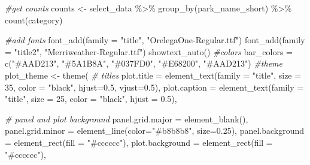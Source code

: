 \documentclass[
]{article}
\newenvironment{Shaded}{\begin{snugshade}}{\end{snugshade}}
\newcommand{\AttributeTok}[1]{\textcolor[rgb]{0.77,0.63,0.00}{#1}}
\newcommand{\CommentTok}[1]{\textcolor[rgb]{0.56,0.35,0.01}{\textit{#1}}}
\newcommand{\DecValTok}[1]{\textcolor[rgb]{0.00,0.00,0.81}{#1}}
\newcommand{\FloatTok}[1]{\textcolor[rgb]{0.00,0.00,0.81}{#1}}
\newcommand{\FunctionTok}[1]{\textcolor[rgb]{0.00,0.00,0.00}{#1}}
\newcommand{\NormalTok}[1]{#1}
\newcommand{\OtherTok}[1]{\textcolor[rgb]{0.56,0.35,0.01}{#1}}
\newcommand{\SpecialCharTok}[1]{\textcolor[rgb]{0.00,0.00,0.00}{#1}}
\newcommand{\StringTok}[1]{\textcolor[rgb]{0.31,0.60,0.02}{#1}}
\begin{document}
\begin{Shaded}
\begin{Highlighting}[]
\CommentTok{\#get counts}
\NormalTok{counts }\OtherTok{\textless{}{-}}\NormalTok{ select\_data }\SpecialCharTok{\%\textgreater{}\%} \FunctionTok{group\_by}\NormalTok{(park\_name\_short) }\SpecialCharTok{\%\textgreater{}\%} \FunctionTok{count}\NormalTok{(category)}
\end{Highlighting}
\end{Shaded}

\begin{Shaded}
\begin{Highlighting}[]
\CommentTok{\#add fonts}
\FunctionTok{font\_add}\NormalTok{(}\AttributeTok{family =} \StringTok{"title"}\NormalTok{, }\StringTok{"OrelegaOne{-}Regular.ttf"}\NormalTok{)}
\FunctionTok{font\_add}\NormalTok{(}\AttributeTok{family =} \StringTok{"title2"}\NormalTok{, }\StringTok{"Merriweather{-}Regular.ttf"}\NormalTok{)}
\FunctionTok{showtext\_auto}\NormalTok{()}
\CommentTok{\#colors}
\NormalTok{bar\_colors }\OtherTok{=} \FunctionTok{c}\NormalTok{(}\StringTok{"\#AAD213"}\NormalTok{, }\StringTok{"\#5A1B8A"}\NormalTok{, }\StringTok{"\#037FD0"}\NormalTok{, }\StringTok{"\#E68200"}\NormalTok{, }\StringTok{"\#AAD213"}\NormalTok{)}
\CommentTok{\#theme}
\NormalTok{plot\_theme }\OtherTok{\textless{}{-}} \FunctionTok{theme}\NormalTok{(}
 \CommentTok{\# titles}
  \AttributeTok{plot.title =} \FunctionTok{element\_text}\NormalTok{(}\AttributeTok{family =} \StringTok{"title"}\NormalTok{, }\AttributeTok{size =} \DecValTok{35}\NormalTok{, }\AttributeTok{color =} \StringTok{"black"}\NormalTok{, }\AttributeTok{hjust=}\FloatTok{0.5}\NormalTok{, }\AttributeTok{vjust=}\FloatTok{0.5}\NormalTok{),}
  \AttributeTok{plot.caption =} \FunctionTok{element\_text}\NormalTok{(}\AttributeTok{family =} \StringTok{"title"}\NormalTok{, }\AttributeTok{size =} \DecValTok{25}\NormalTok{, }\AttributeTok{color =} \StringTok{"black"}\NormalTok{, }\AttributeTok{hjust =} \FloatTok{0.5}\NormalTok{),}
  
  \CommentTok{\# panel and plot background}
  \AttributeTok{panel.grid.major =} \FunctionTok{element\_blank}\NormalTok{(),}
  \AttributeTok{panel.grid.minor =} \FunctionTok{element\_line}\NormalTok{(}\AttributeTok{color=}\StringTok{"\#b8b8b8"}\NormalTok{, }\AttributeTok{size=}\FloatTok{0.25}\NormalTok{),}
  \AttributeTok{panel.background =} \FunctionTok{element\_rect}\NormalTok{(}\AttributeTok{fill =} \StringTok{"\#cccccc"}\NormalTok{),}
  \AttributeTok{plot.background =} \FunctionTok{element\_rect}\NormalTok{(}\AttributeTok{fill =} \StringTok{"\#cccccc"}\NormalTok{),}
  

\end{Highlighting}
\end{Shaded}
\end{document}
